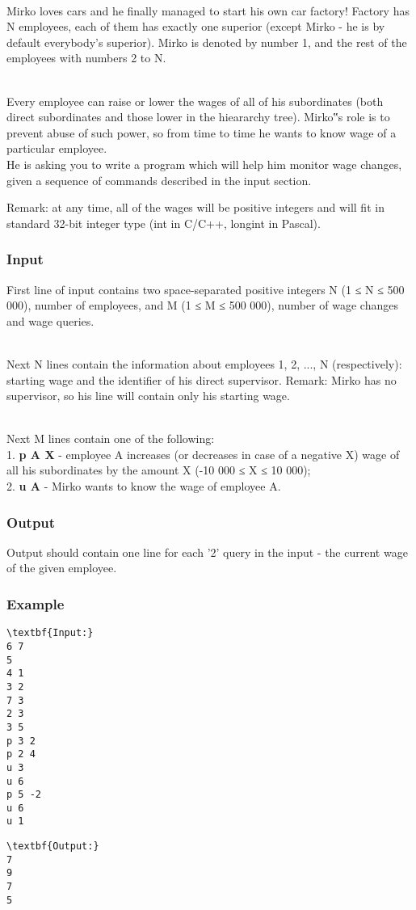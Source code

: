 

 

Mirko loves cars and he finally managed to start his own car factory! Factory has N employees, each of them has exactly one superior (except Mirko - he is by default everybody's superior). Mirko is denoted by number 1, and the rest of the employees with numbers 2 to N.


\\Every employee can raise or lower the wages of all of his subordinates (both direct subordinates and those lower in the hieararchy tree). Mirko‟s role is to prevent abuse of such power, so from time to time he wants to know wage of a particular employee.
\\He is asking you to write a program which will help him monitor wage changes, given a sequence of commands described in the input section.

Remark: at any time, all of the wages will be positive integers and will fit in standard 32-bit integer type (int in C/C++, longint in Pascal).

\subsubsection{Input}

First line of input contains two space-separated positive integers N (1 ≤ N ≤ 500 000), number of employees, and M (1 ≤ M ≤ 500 000), number of wage changes and wage queries.


\\Next N lines contain the information about employees 1, 2, ..., N (respectively): starting wage and the identifier of his direct supervisor. Remark: Mirko has no supervisor, so his line will contain only his starting wage.


\\Next M lines contain one of the following:
\\1. \textbf{ p A X } - employee A increases (or decreases in case of a negative X) wage of all his subordinates by the amount X (-10 000 ≤ X ≤ 10 000);
\\2. \textbf{ u A } - Mirko wants to know the wage of employee A.

\subsubsection{Output}

Output should contain one line for each '2' query in the input - the current wage of the given employee.

\subsubsection{Example}
\begin{verbatim}
\textbf{Input:}
6 7 
5 
4 1 
3 2 
7 3 
2 3 
3 5 
p 3 2 
p 2 4 
u 3 
u 6 
p 5 -2 
u 6 
u 1
\end{verbatim}
\begin{verbatim}
\textbf{Output:}
7 
9
7
5\end{verbatim}